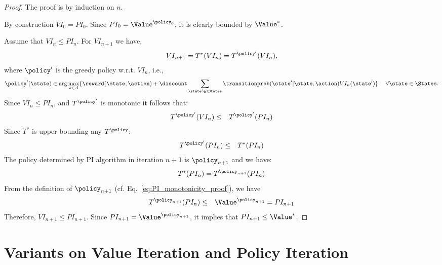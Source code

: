 \begin{proof} The proof is by induction on $n$.

 By construction  $VI_0=PI_0$.
%
Since $PI_0=\Value^{\policy_0}$, it is clearly bounded by
$\Value^*$.

 Assume that $VI_n\leq PI_n$. For
$VI_{n+1}$ we have,
\begin{eqnarray*}
VI_{n+1} = T^*(VI_{n}) = T^{\policy'}(VI_{n}),
\end{eqnarray*}
where  $\policy'$ is the greedy policy w.r.t. $VI_n$, i.e.,
$$
\policy'(\state) \in \arg\max_{a\in A}\{\reward(\state,\action) +
\discount \sum_{\state'\in \States}
\transitionprob(\state'|\state,\action)VI_{n}(\state')\} \quad\;\forall\state\in\States.
$$
Since $VI_n \leq PI_n$, and $T^{\policy'}$ is monotonic it follows
that:
\begin{eqnarray*}
T^{\policy'}(VI_{n}) & \leq &T^{\policy'}(PI_{n})
\end{eqnarray*}
Since $T^*$ is upper bounding any $T^\policy$:
\begin{eqnarray*}
T^{\policy'}(PI_{n}) & \leq & T^*(PI_{n})
\end{eqnarray*}
The policy determined by PI algorithm in iteration $n+1$ is
$\policy_{n+1}$ and we have:
\begin{eqnarray*}
T^*(PI_{n})=T^{\policy_{n+1}}(PI_{n})
\end{eqnarray*}
From the definition of $\policy_{n+1}$ (cf. Eq.~\ref{eq:PI_monotonicity_proof}), we have
\begin{eqnarray*}
T^{\policy_{n+1}}(PI_{n}) &\leq& \Value^{\policy_{n+1}}=PI_{n+1}
\end{eqnarray*}
Therefore, $VI_{n+1} \leq PI_{n+1}$. Since
$PI_{n+1}=\Value^{\policy_{n+1}}$, it implies that $PI_{n+1}\leq
\Value^*$.
\end{proof}


\section{Variants on Value Iteration and Policy Iteration}

